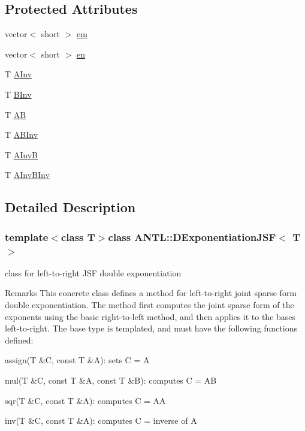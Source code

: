 \subsection*{Protected Attributes}
\begin{DoxyCompactItemize}
\item 
vector$<$ short $>$ \hyperlink{classANTL_1_1DExponentiationJSF_a5d89a984840cab1ed1308e3c39ae6896}{em}
\item 
vector$<$ short $>$ \hyperlink{classANTL_1_1DExponentiationJSF_af7f5f0fc2cc41ee18f988b430930fec4}{en}
\item 
T \hyperlink{classANTL_1_1DExponentiationJSF_a74e6f753c656dd8ca7b113597dcb405f}{A\-Inv}
\item 
T \hyperlink{classANTL_1_1DExponentiationJSF_afe3234f9976953b1c3484d680e8a6799}{B\-Inv}
\item 
T \hyperlink{classANTL_1_1DExponentiationJSF_a76d1d64d21b9353c39f03febbdede159}{A\-B}
\item 
T \hyperlink{classANTL_1_1DExponentiationJSF_adf4d906e0790f0fa2090ff64dd43a0ca}{A\-B\-Inv}
\item 
T \hyperlink{classANTL_1_1DExponentiationJSF_a9056653402c022e724fe79243ee714a2}{A\-Inv\-B}
\item 
T \hyperlink{classANTL_1_1DExponentiationJSF_ab93d0817494fa5b21b96b2b7bf7e6870}{A\-Inv\-B\-Inv}
\end{DoxyCompactItemize}


\subsection{Detailed Description}
\subsubsection*{template$<$class T$>$class A\-N\-T\-L\-::\-D\-Exponentiation\-J\-S\-F$<$ T $>$}

class for left-\/to-\/right J\-S\-F double exponentiation 

\begin{DoxyRemark}{Remarks}
This concrete class defines a method for left-\/to-\/right joint sparse form double exponentiation. The method first computes the joint sparse form of the exponents using the basic right-\/to-\/left method, and then applies it to the bases left-\/to-\/right. The base type is templated, and must have the following functions defined\-:
\begin{DoxyItemize}
\item assign(\-T \&\-C, const T \&\-A)\-: sets C = A
\item mul(\-T \&\-C, const T \&\-A, const T \&\-B)\-: computes C = A\-B
\item sqr(\-T \&\-C, const T \&\-A)\-: computes C = A\-A
\item inv(\-T \&\-C, const T \&\-A)\-: computes C = inverse of A 
\end{DoxyItemize}
\end{DoxyRemark}


